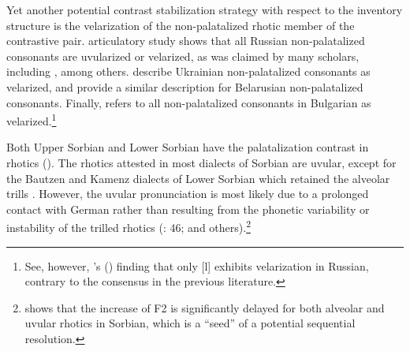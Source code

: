\documentclass[output=paper]{langscibook}
\begin{document}
Yet another potential contrast stabilization strategy with respect to the inventory structure is the velarization of the non-palatalized rhotic member of the contrastive pair.  articulatory study shows that all Russian non-palatalized consonants are uvularized or velarized, as was claimed by many scholars, including \citet{Trubetzkoy1939,Reformatskii1956,Reformatskii1967,Halle1959,Padgett2001,Kochetov2002}, among others. \citet{Pompino-MarschallEtAl2016} describe Ukrainian non-palatalized consonants as velarized, and \citet{BirdLitvin2020} provide a similar description for Belarusian non-palatalized consonants. Finally, \citet[42]{Radkova2009} refers to all non-palatalized consonants in Bulgarian as velarized.\footnote{See, however, \citeauthor{Proctor2009}'s (\citeyear*{Proctor2009,Proctor2011}) finding that only [l] exhibits velarization in Russian, contrary to the consensus in the previous literature.}

Both Upper Sorbian and Lower Sorbian have the palatalization contrast in rhotics (\citealt{Stone1993,Stone1998,Schaarschmidt1997}). The rhotics attested in most dialects of Sorbian are uvular, except for the Bautzen and Kamenz dialects of Lower Sorbian which retained the alveolar trills \citep[156]{Schaarschmidt1997}. However, the uvular pronunciation is most likely due to a prolonged contact with German rather than resulting from the phonetic variability or instability of the trilled rhotics (\citealt{Howson2018,Jaworski2018}: 46; and others).\footnote{\citet{Howson2018} shows that the increase of F2 is significantly delayed for both alveolar and uvular rhotics in Sorbian, which is a “seed” of a potential sequential resolution.}
\end{document}
